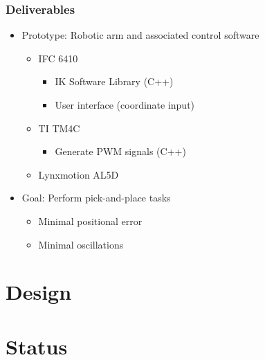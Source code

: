 \documentclass[10pt, compress]{beamer}
\begin{document}
\begin{frame}[fragile]
  \frametitle{Deliverables}
  \begin{itemize}
    \item Prototype: Robotic arm and associated control software
      \begin{itemize}[label=$\circ$]
        \item IFC 6410
          \begin{itemize}[label=$\diamond$]
            \item IK Software Library (C++)
            \item User interface (coordinate input)
          \end{itemize}
        \item TI TM4C
          \begin{itemize}[label=$\circ$]
            \item Generate PWM signals (C++)
          \end{itemize}
        \item Lynxmotion AL5D
      \end{itemize}
    \item Goal: Perform pick-and-place tasks
      \begin{itemize}[label=$\circ$]
        \item Minimal positional error
        \item Minimal oscillations
      \end{itemize}
  \end{itemize}
\end{frame}

\section{Design}

\begin{frame}[fragile]
\end{frame}

\section{Status}
\end{document}
